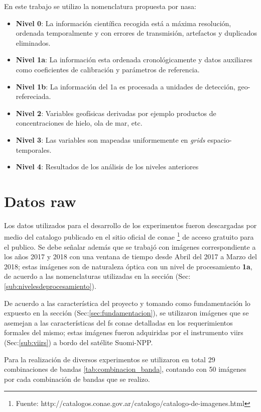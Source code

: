 En este trabajo se utilizo la nomenclatura propuesta por \ac{nasa}:
\begin{itemize}
	\item \textbf{Nivel 0}: La información científica recogida está a máxima resolución, ordenada temporalmente y con errores de transmisión, artefactos y duplicados eliminados.
 	\item \textbf{Nivel 1a}: La información esta ordenada cronológicamente y datos auxiliares como coeficientes de calibración y parámetros de referencia.
 	\item \textbf{Nivel 1b}: La información del 1a es procesada a unidades de detección, geo-refereciada.
 	\item \textbf{Nivel 2}: Variables geofísicas derivadas por ejemplo productos de concentraciones de hielo, ola de mar, etc.
 	\item \textbf{Nivel 3}: Las variables son mapeadas uniformemente en \textit{grids} espacio-temporales.
 	\item \textbf{Nivel 4}: Resultados de los análisis de los niveles anteriores
\end{itemize}


\section{Datos raw}\label{sec:datosutilizados}

Los datos utilizados para el desarrollo de los experimentos fueron descargadas por medio del catalogo  publicado en el sitio oficial de \ac{conae} \footnote{Fuente: http://catalogos.conae.gov.ar/catalogo/catalogo-de-imagenes.html} de acceso gratuito para el publico. Se debe señalar además que se trabajó con imágenes correspondiente a los años 2017 y 2018 con una ventana de tiempo desde Abril del 2017 a Marzo del 2018; estas imágenes son de naturaleza óptica con un nivel de procesamiento \textbf{1a}, de acuerdo a las nomenclaturas utilizadas en la sección (Sec:\ref{sub:nivelesdeprocesamiento}).

De acuerdo a las característica del proyecto y tomando como fundamentación lo expuesto en la sección (Sec:\ref{sec:fundamentacion}), se utilizaron imágenes que se asemejan a las características del \ac{fs} \ac{conae} detalladas en los requerimientos formales del mismo; estas imágenes fueron adquiridas por el instrumento \ac{viirs} (Sec:\ref{sub:viirs}) a bordo del satélite Suomi-NPP.


Para la realización de diversos experimentos se utilizaron en total 29 combinaciones de bandas \ref{tab:combinacion_banda}, contando con 50 imágenes por cada combinación de bandas que se realizo.


